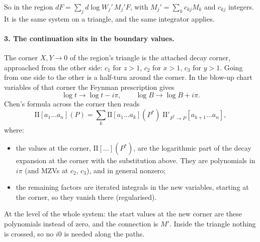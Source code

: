 \documentclass[11pt]{article}
\begin{document}
So in the region $dF=\sum_j d\log W_j'\,M_j'F$, with $M_j'=\sum_k c_{kj}M_k$ and $c_{kj}$ integers. It is the same
system on a triangle, and the same integrator applies.

\paragraph{3. The continuation sits in the boundary values.} The corner $X,Y\to0$ of the region's triangle is the
attached decay corner, approached from the other side: $c_1$ for $z>1$, $c_2$ for $x>1$, $c_3$ for $y>1$. Going from
one side to the other is a half-turn around the corner. In the blow-up chart variables of that corner the Feynman
prescription gives
\[ \log t\to\log t-i\pi,\qquad \log B\to\log B+i\pi . \]
Chen's formula across the corner then reads
\[ \mathrm{II}[a_1\dots a_n](P)=\sum_k \mathrm{II}[a_1\dots a_k](P^*)\;\mathrm{II}'_{P^*\to P}[a_{k+1}\dots a_n] , \]
where:
\begin{itemize}
\item the values at the corner, $\mathrm{II}[\dots](P^*)$, are the logarithmic part of the decay expansion at the
  corner with the substitution above. They are polynomials in $i\pi$ (and MZVs at $c_2$, $c_3$), and in general
  nonzero;
\item the remaining factors are iterated integrals in the new variables, starting at the corner, so they vanish there
  (regularised).
\end{itemize}
At the level of the whole system: the start values at the new corner are these polynomials instead of zero, and the
connection is $M'$. Inside the triangle nothing is crossed, so no $i0$ is needed along the paths.

\begin{center}
\end{center}
\end{document}
